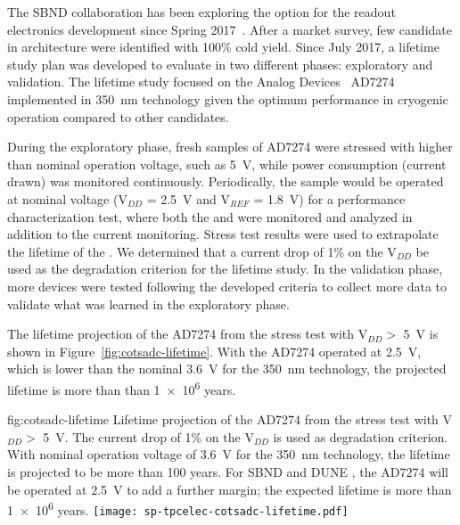 The SBND collaboration has been exploring the   option 
for the  readout electronics development since Spring 
2017~\cite{Chen:2018zic}. After a market survey, few candidate  
in  architecture were identified with 100\% cold yield. Since 
July 2017, a lifetime study plan was developed to evaluate  
 in two different phases: exploratory and validation. The 
lifetime study focused on the Analog Devices~\cite{AnalogDevices} AD7274~\cite{AD7274}
implemented in  \SI{350}{nm}  technology given 
the optimum performance in cryogenic operation compared to other candidates.

During the exploratory phase, fresh samples of   
AD7274 were stressed with higher than nominal operation voltage, such as
\SI{5}{V}, while power consumption (current drawn) was monitored continuously. 
Periodically, the sample would be operated at nominal voltage (V$_{DD}$ = \SI{2.5}{V} 
and V$_{REF}$ = \SI{1.8}{V}) for a performance characterization test, where 
both the  and  were monitored and analyzed in addition 
to the current monitoring. Stress test results were used to extrapolate the 
lifetime of the  . We determined that a current drop 
of \num{1}\% on the V$_{DD}$ be used as the degradation criterion for the lifetime 
study. In the validation phase, more devices were tested following the developed 
criteria to collect more data to validate what was learned in the exploratory phase.

The lifetime projection of the AD7274  from the stress 
test with V$_{DD} >$ \SI{5}{V} is shown in Figure~\ref{fig:cotsadc-lifetime}. 
With the AD7274 operated at \SI{2.5}{V}, which is lower than the nominal 
\SI{3.6}{V} for the \SI{350}{nm}  technology, the projected lifetime 
is more than than \num{1e6} years.

\begin{dunefigure}
{fig:cotsadc-lifetime}
{Lifetime projection of the   AD7274 from the stress test 
with V$_{DD} >$ \SI{5}{V}. The current drop of 1\% on the V$_{DD}$ is used as 
degradation criterion. With nominal operation voltage of \SI{3.6}{V} for the 
\SI{350}{nm}  technology, the lifetime is projected to be more 
than 100 years. For SBND and DUNE , the AD7274 will be operated at 
\SI{2.5}{V} to add a further margin; the expected lifetime is more 
than \num{1e6} years.}
\texttt{[image: sp-tpcelec-cotsadc-lifetime.pdf]}
\end{dunefigure}

